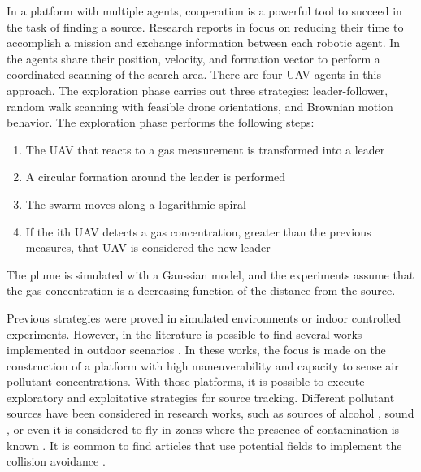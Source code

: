 In a platform with multiple agents, cooperation is a powerful tool to succeed in the task of finding a source.
Research reports in \cite{facinelli2019cooperative, euler2017optimized, bayat2017environmental, li2017potential} focus on reducing their time to accomplish a mission and exchange information between each robotic agent. 
In \cite{facinelli2019cooperative} the agents share their position, velocity, and formation vector to perform a coordinated scanning of the search area. 
There are four UAV agents in this approach. 
The exploration phase carries out three strategies: leader-follower, random walk scanning with feasible drone orientations, and Brownian motion behavior. 
The exploration phase performs the following steps:
\begin{enumerate}
    \item The UAV that reacts to a gas measurement is transformed into a leader
    \item A circular formation around the leader is performed
    \item The swarm moves along a logarithmic spiral
    \item If the ith UAV detects a gas concentration, greater than the previous measures, that UAV is considered the new leader 
\end{enumerate}

The plume is simulated with a Gaussian model, and the experiments assume that the gas concentration is a decreasing function of the distance from the source.

Previous strategies were proved in simulated environments or indoor controlled experiments. 
However, in the literature is possible to find several works implemented in
outdoor scenarios \cite{bayat2017environmental,villa2016development,ya2017uav,yungaicela2017design}. 
In these works, the focus is made on the construction of a platform with high maneuverability and capacity to sense air pollutant concentrations. 
With those platforms, it is possible to execute exploratory and exploitative strategies for source tracking.
Different pollutant sources have been considered in research works, such as sources of alcohol \cite{rossi2015autonomous}, sound \cite{hoshiba2017design}, or even it is considered to fly in zones where the presence of contamination is known \cite{black2018adaption,yang2018natural,yang2017real}.
It is common to find articles that use potential fields to implement the collision avoidance \cite{kristiansen2012operational,han2018small,fu2019pollution,marjovi2014optimal,budiyanto2015uav}.

